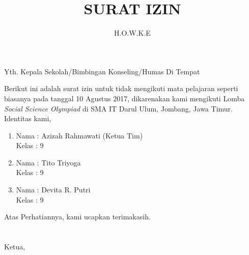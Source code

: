 \documentclass[12pt,a4paper]{letter}
\author{H.O.W.K.E}
\title{SURAT IZIN}
\begin{document}
	Yth. Kepala Sekolah/Bimbingan Konseling/Humas
	Di Tempat
	
	Berikut ini adalah surat izin untuk tidak mengikuti mata pelajaran seperti biasanya pada tanggal 10 Agustus 2017, dikarenakan kami mengikuti Lomba \textit{Social Science Olympiad} di SMA IT Darul Ulum, Jombang, Jawa Timur. Identitas kami, 
	\begin{enumerate}
		\item Nama 	: Azizah Rahmawati (Ketua Tim)\\
			  Kelas	: 9
		\item Nama 	: Tito Triyoga\\
			  Kelas : 9
		\item Nama	: Devita R. Putri\\
			  Kelas	: 9
	\end{enumerate}  
	Atas Perhatiannya, kami ucapkan terimakasih.\\
	\\
	\\
	Ketua,
	\\
	\\
	\\
	
	
	
\end{document}
